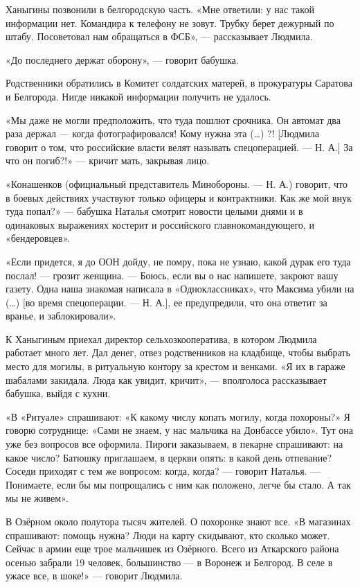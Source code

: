 Ханыгины позвонили в белгородскую часть. «Мне ответили: у нас такой информации нет. Командира к телефону не зовут. Трубку берет дежурный по штабу. Посоветовал нам обращаться в ФСБ», --- рассказывает Людмила.

«До последнего держат оборону», --- говорит бабушка.

\begin{fancyquotes}
    Родственники обратились в Комитет солдатских матерей, в прокуратуры Саратова и Белгорода. Нигде никакой информации получить не удалось.
\end{fancyquotes}

«Мы даже не могли предположить, что туда пошлют срочника. Он автомат два раза держал --- когда фотографировался! Кому нужна эта (…) ?! [Людмила говорит о том, что российские власти велят называть спецоперацией. --- Н. А.] За что он погиб?!» --- кричит мать, закрывая лицо.

«Конашенков (официальный представитель Минобороны. --- Н. А.) говорит, что в боевых действиях участвуют только офицеры и контрактники. Как же мой внук туда попал?» --- бабушка Наталья смотрит новости целыми днями и в одинаковых выражениях костерит и российского главнокомандующего, и «бендеровцев».

«Если придется, я до ООН дойду, не помру, пока не узнаю, какой дурак его туда послал! --- грозит женщина. --- Боюсь, если вы о нас напишете, закроют вашу газету. Одна наша знакомая написала в «Одноклассниках», что Максима убили на (…) [во время спецоперации. --- Н. А.], ее предупредили, что она ответит за вранье, и заблокировали».

К Ханыгиным приехал директор сельхозкооператива, в котором Людмила работает много лет. Дал денег, отвез родственников на кладбище, чтобы выбрать место для могилы, в ритуальную контору за крестом и венками. «Я их в гараже шабалами закидала. Люда как увидит, кричит», --- вполголоса рассказывает бабушка, выйдя с кухни.

«В «Ритуале» спрашивают: «К какому числу копать могилу, когда похороны?» Я говорю сотруднице: «Сами не знаем, у нас мальчика на Донбассе убило». Тут она уже без вопросов все оформила. Пироги заказываем, в пекарне спрашивают: на какое число? Батюшку приглашаем, в церкви опять: в какой день отпевание? Соседи приходят с тем же вопросом: когда, когда? --- говорит Наталья. --- Понимаете, если бы мы попрощались с ним как положено, легче бы стало. А так мы не живем».

В Озёрном около полутора тысяч жителей. О похоронке знают все. «В магазинах спрашивают: помощь нужна? Люди на карту скидывают, кто сколько может. Сейчас в армии еще трое мальчишек из Озёрного. Всего из Аткарского района осенью забрали 19 человек, большинство --- в Воронеж и Белгород. В селе в ужасе все, в шоке!» --- говорит Людмила.

